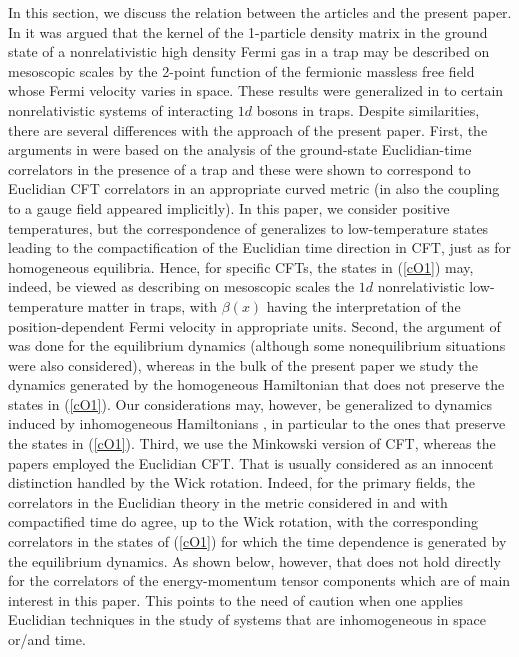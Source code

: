 \documentclass[12pt,a4paper]{article}
\theoremstyle{definition}
\theoremstyle{remark}
\begin{document}
In this section, we discuss the relation between
the articles \cite{DSVC,BD1,DSC,BD2} and the present paper.
In \cite{DSVC} it was argued that the kernel of the 1-particle density matrix
in the ground state of a nonrelativistic high density Fermi gas in a trap
may be described on mesoscopic scales by the 2-point function of the fermionic
massless free field whose Fermi velocity varies in space. These results
were generalized in \cite{BD1,DSC,BD2} to certain nonrelativistic systems
of interacting $1d$ bosons in traps. Despite similarities, there are several
differences with the approach of the present paper. First, the arguments
in \cite{DSVC} were based on the analysis of the ground-state Euclidian-time
correlators in the presence of a trap and these were shown to correspond
to Euclidian CFT correlators in an appropriate curved metric (in \cite{BD2}
also the coupling to a gauge field appeared implicitly). In this paper, we
consider positive temperatures, but the correspondence of \cite{DSVC}
generalizes to low-temperature states leading to the compactification of
the Euclidian time direction in CFT, just as for homogeneous equilibria.
Hence, for specific CFTs, the states in (\ref{cO1}) may, indeed, be viewed
as describing on mesoscopic scales the $1d$ nonrelativistic low-temperature
matter in traps, with $\beta(x)$ having the interpretation of the
position-dependent Fermi velocity in appropriate units. Second, the argument
of \cite{DSVC} was done for the equilibrium dynamics (although some
nonequilibrium situations were also considered), whereas in the bulk of
the present paper we study the dynamics generated by the homogeneous
Hamiltonian that does not preserve the states in (\ref{cO1}). Our considerations
may, however, be generalized to dynamics induced by inhomogeneous Hamiltonians
\cite{PM}, in particular to the ones that preserve the states in (\ref{cO1}).
Third, we use the Minkowski version of CFT, whereas the papers
\cite{DSVC,BD1,DSC,BD2} employed the Euclidian CFT. That is usually
considered as an innocent distinction handled by the Wick rotation.
Indeed, for the primary fields, the correlators in the Euclidian theory
in the metric considered in \cite{DSVC,BD1,DSC,BD2} and with compactified
time do agree, up to the Wick rotation, with the corresponding correlators
in the states of (\ref{cO1}) for which the time dependence is generated by
the equilibrium dynamics. As shown below, however, that does not hold directly
for the correlators of the energy-momentum tensor components which are of main
interest in this paper. This points to the need of caution when one applies
Euclidian techniques in the study of systems that are inhomogeneous
in space or/and time.
\vskip 0.1cm
\end{document}
